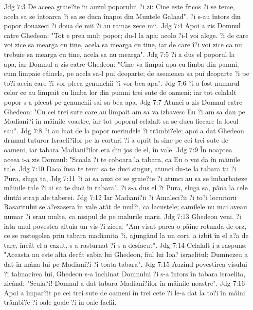Jdg 7:3  De aceea graie?te în auzul poporului ?i zi: Cine este fricos ?i se teme, acela sa se întoarca ?i sa se duca înapoi din Muntele Galaad". ?i s-au întors din popor douazeci ?i doua de mii ?i au ramas zece mii.
Jdg 7:4  Apoi a zis Domnul catre Ghedeon: "Tot e prea mult popor; du-l la apa; acolo ?i-l voi alege. ?i de care voi zice sa mearga cu tine, acela sa mearga cu tine, iar de care î?i voi zice ca nu trebuie sa mearga cu tine, acela sa nu mearga".
Jdg 7:5  ?i a dus el poporul la apa, iar Domnul a zis catre Ghedeon: "Cine va limpai apa cu limba din pumni, cum limpaie câinele, pe acela sa-l pui deoparte; de asemenea sa pui deoparte ?i pe to?i aceia care-?i vor pleca genunchii ?i vor bea apa".
Jdg 7:6  ?i a fost numarul celor ce au limpait cu limba lor din pumni trei sute de oameni; iar tot celalalt popor s-a plecat pe genunchii sai sa bea apa.
Jdg 7:7  Atunci a zis Domnul catre Ghedeon: "Cu cei trei sute care au limpait am sa va izbavesc Eu ?i am sa dau pe Madiani?i în mâinile voastre, iar tot poporul celalalt sa se duca fiecare la locul sau".
Jdg 7:8  ?i au luat de la popor merindele ?i trâmbi?ele; apoi a dat Ghedeon drumul tuturor Israeli?ilor pe la corturi ?i a oprit la sine pe cei trei sute de oameni, iar tabara Madiani?ilor era din jos de el, în vale.
Jdg 7:9  În noaptea aceea i-a zis Domnul: "Scoala ?i te coboara la tabara, ca Eu o voi da în mâinile tale.
Jdg 7:10  Daca însa te temi sa te duci singur, atunci du-te la tabara tu ?i Pura, sluga ta,
Jdg 7:11  ?i ai sa auzi ce se graie?te ?i atunci au sa se îmbarbateze mâinile tale ?i ai sa te duci în tabara". ?i s-a dus el ?i Pura, sluga sa, pâna la cele dintâi straji ale taberei.
Jdg 7:12  Iar Madiani?ii ?i Amaleci?ii ?i to?i locuitorii Rasaritului se a?ezasera în vale atât de mul?i, ca lacustele; camilele nu mai aveau numar ?i erau multe, ca nisipul de pe malurile marii.
Jdg 7:13  Ghedeon veni. ?i iata unul povestea altuia un vis ?i zicea: "Am visat parca o pâine rotunda de orz, ce se rostogolea prin tabara madianita ?i, ajungând la un cort, a izbit în el a?a de tare, încât el a cazut, s-a rasturnat ?i s-a desfacut".
Jdg 7:14  Celalalt i-a raspuns: "Aceasta nu este alta decât sabia lui Ghedeon, fiul lui Ioa? israelitul; Dumnezeu a dat în mâna lui pe Madiani?i ?i toata tabara".
Jdg 7:15  Auzind povestirea visului ?i talmacirea lui, Ghedeon s-a închinat Domnului ?i s-a întors în tabara israelita, zicând: "Scula?i! Domnul a dat tabara Madiani?ilor în mâinile noastre".
Jdg 7:16  Apoi a împar?it pe cei trei sute de oameni în trei cete ?i le-a dat la to?i în mâini trâmbi?e ?i oale goale ?i în oale faclii.
